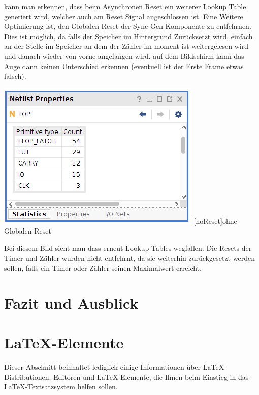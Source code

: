 \documentclass[12pt,a4paper,bibliography=totoc,listof=totoc]{scrartcl}
\begin{document}
kann man erkennen, dass beim Asynchronen Reset ein weiterer Lookup Table generiert wird, welcher auch am Reset Signal angeschlossen ist.
\newline
Eine Weitere Optimierung ist, den Globalen Reset der Sync-Gen Komponente zu entfehrnen. Dies ist möglich, da falls der Speicher im Hintergrund
Zurücksetzt wird, einfach an der Stelle im Speicher an dem der Zähler im moment ist weitergelesen wird und danach wieder von vorne angefangen wird.
auf dem Bildschirm kann das Auge dann keinen Unterschied erkennen (eventuell ist der Erste Frame etwas falsch).

\vspace{1em}
\begin{minipage}{\linewidth}
	\centering
	\includegraphics[width=0.5\linewidth]{pics/ohneResetNetProp.png}
	[noReset]{ohne Globalen Reset}
	\label{fig:no Reset}
\end{minipage}

Bei diesem Bild sieht man dass erneut Lookup Tables wegfallen. Die Resets der Timer und Zähler wurden nicht entfehrnt, da sie weiterhin zurückgesetzt werden 
sollen, falls ein Timer oder Zähler seinen Maximalwert erreicht.


\pagebreak
\section{Fazit und Ausblick}


\pagebreak
\section{\LaTeX-Elemente}
Dieser Abschnitt beinhaltet lediglich einige Informationen über \LaTeX-Distributionen, Editoren und \LaTeX-Elemente, die Ihnen beim Einstieg in das \LaTeX-Textsatzsystem helfen sollen.
\end{document}
